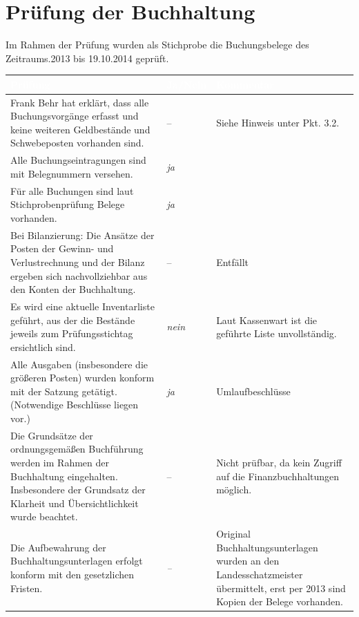 \documentclass[%
	titlepage,oneside,12pt,headlines=1.5,numbers=noenddot, chapterprefix=false,parskip=full-,DIV=14,pagesize]{scrreprt}
\begin{document}
\section{Prüfung der Buchhaltung}
Im Rahmen der Prüfung wurden als Stichprobe die Buchungsbelege des Zeitraums.2013 bis 19.10.2014 geprüft.

\begin{longtable}[ht]{|p{} p{} p{}|}
\hline\rowcolor{pirateorange} 
	\footnotesize\textcolor{white}{\textbf{Prüfung}} & \footnotesize\textcolor{white}{\textbf{Ja/Nein}} & \footnotesize\textcolor{white}{\textbf{Kommentar}}\\\endhead
        \scriptsize Frank Behr hat erklärt, dass alle Buchungsvorgänge erfasst und keine weiteren Geldbestände und Schwebeposten vorhanden sind. & \scriptsize \textit{} -- & \scriptsize Siehe Hinweis unter Pkt. 3.2. \\
        \scriptsize Alle Buchungseintragungen sind mit Belegnummern versehen. & \scriptsize \textit{ja} & \scriptsize \\
        \scriptsize Für alle Buchungen sind laut Stichprobenprüfung Belege vorhanden. & \scriptsize \textit{ja} & \scriptsize \\
        \scriptsize Bei Bilanzierung: Die Ansätze der Posten der Gewinn- und Verlustrechnung und der Bilanz ergeben sich nachvollziehbar aus den Konten der Buchhaltung. & \scriptsize \textit{} -- & \scriptsize Entfällt \\
        \scriptsize Es wird eine aktuelle Inventarliste geführt, aus der die Bestände jeweils zum Prüfungsstichtag ersichtlich sind. & \scriptsize \textit{nein} & \scriptsize Laut Kassenwart ist die geführte Liste unvollständig. \\
        \scriptsize Alle Ausgaben (insbesondere die größeren Posten) wurden konform mit der Satzung getätigt. (Notwendige Beschlüsse liegen vor.) & \scriptsize \textit{ja} & \scriptsize Umlaufbeschlüsse \\
        \scriptsize Die Grundsätze der ordnungsgemäßen Buchführung werden im Rahmen der Buchhaltung eingehalten. Insbesondere der Grundsatz der Klarheit und Übersichtlichkeit wurde beachtet. & \scriptsize \textit{} -- & \scriptsize Nicht prüfbar, da kein Zugriff auf die Finanzbuchhaltungen möglich. \\
        \scriptsize Die Aufbewahrung der Buchhaltungsunterlagen erfolgt konform mit den gesetzlichen Fristen. & \scriptsize \textit{--} & \scriptsize Original Buchhaltungsunterlagen wurden an den Landesschatzmeister übermittelt, erst per 2013 sind Kopien der Belege vorhanden.\\
\hline
\end{longtable}
\end{document}
